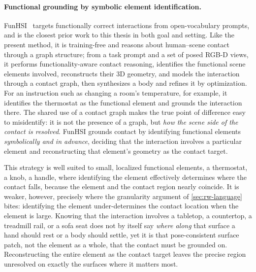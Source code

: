 \paragraph{Functional grounding by symbolic element identification.} FunHSI~\cite{liu2026funhsi} targets functionally correct interactions from open-vocabulary prompts, and is the closest prior work to this thesis in both goal and setting. Like the present method, it is training-free and reasons about human--scene contact through a graph structure; from a task prompt and a set of posed RGB-D views, it performs functionality-aware contact reasoning, identifies the functional scene elements involved, reconstructs their 3D geometry, and models the interaction through a contact graph, then synthesizes a body and refines it by optimization. For an instruction such as changing a room's temperature, for example, it identifies the thermostat as the functional element and grounds the interaction there. The shared use of a contact graph makes the true point of difference easy to misidentify: it is not the presence of a graph, but \emph{how the scene side of the contact is resolved}. FunHSI grounds contact by identifying functional elements \emph{symbolically and in advance}, deciding that the interaction involves a particular element and reconstructing that element's geometry as the contact target.

This strategy is well suited to small, localized functional elements, a thermostat, a knob, a handle, where identifying the element effectively determines where the contact falls, because the element and the contact region nearly coincide. It is weaker, however, precisely where the granularity argument of \cref{sec:rw-language} bites: identifying the element under-determines the contact location when the element is large. Knowing that the interaction involves a tabletop, a countertop, a treadmill rail, or a sofa seat does not by itself say \emph{where along} that surface a hand should rest or a body should settle, yet it is that pose-consistent surface patch, not the element as a whole, that the contact must be grounded on. Reconstructing the entire element as the contact target leaves the precise region unresolved on exactly the surfaces where it matters most.

